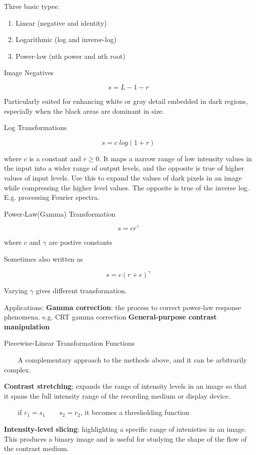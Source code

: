 \documentclass[]{article}
\begin{document}
Three basic types:

\begin{enumerate}
\def\labelenumi{\arabic{enumi}.}
\item
  Linear (negative and identity)
\item
  Logarithmic (log and inverse-log)
\item
  Power-law (nth power and nth root)
\end{enumerate}

Image Negatives

\[s=L-1-r\]

Particularly suited for enhancing white or gray detail embedded in dark
regions, especially when the black areas are dominant in size.

Log Transformations

\[s=c\;log(1+r)\]

where \(c\) is a constant and \(r\geq0\). It maps a narrow range of low
intensity values in the input into a wider range of output levels, and
the opposite is true of higher values of input levels. Use this to
expand the values of dark pixels in an image while compressing the
higher level values. The opposite is true of the inverse log. E.g.
processing Fourier spectra.

Power-Law(Gamma) Transformation

\[s=cr^{\gamma}\]

where \(c\) and \(\gamma\) are postive constants

Sometimes also written as

\[s=c(r+\epsilon)^{\gamma}\]

Varying \(\gamma\) gives different transformation.

Applications: \textbf{Gamma correction}: the process to correct
power-law response phenomena. e.g. CRT gamma correction
\textbf{General-purpose contrast manipulation}

Piecewise-Linear Transformation Functions

\(\qquad\)A complementary approach to the methods above, and it can be
arbitrarily complex.

\textbf{Contrast stretching}; expands the range of intensity levels in
an image so that it spans the full intensity range of the recording
medium or display device.

\(\qquad\)if \(r_1=s_1\quad\quad s_2=r_2\), it becomes a thresholding
function

\textbf{Intensity-level slicing}: highlighting a specific range of
intenisties in an image. This produces a binary image and is useful for
studying the shape of the flow of the contrast medium.
\end{document}
